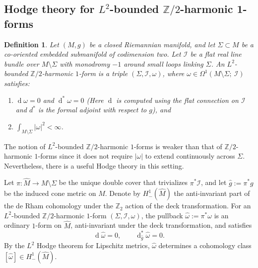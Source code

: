 \documentclass[11pt]{amsart}
\newcommand{\ZT}{\mathbb{Z}/2}
\renewcommand{\d}{\operatorname{d}}
\newtheorem{definition}[theorem]{Definition}
\begin{document}
\subsection{Hodge theory for \texorpdfstring{$L^2$}{L2}-bounded \texorpdfstring{$\ZT$}{Z/2}-harmonic 1-forms}
\begin{definition}
	Let $(M,g)$ be a closed Riemannian manifold, and let $\Sigma\subset M$ be a co-oriented
	embedded submanifold of codimension two. Let $\mathcal I$ be a flat real line bundle over
	$M\setminus\Sigma$ with monodromy $-1$ around small loops linking $\Sigma$.
	An \emph{$L^2$-bounded $\ZT$-harmonic $1$-form} is a triple $(\Sigma,\mathcal I,\omega)$, where
	$\omega\in \Omega^1(M\setminus\Sigma;\:\mathcal I)$ satisfies:
	\begin{enumerate}
		\item $\d \omega=0$ and $\d^\ast\!\omega=0$ (Here $\d$ is computed using the flat connection on
		$\mathcal I$ and $d^\ast$ is the formal adjoint with respect to $g$), and
		\item $\displaystyle \int_{M\setminus\Sigma}|\omega|^2<\infty$.
	\end{enumerate}
\end{definition}

The notion of $L^2$-bounded $\ZT$-harmonic $1$-forms is weaker than that of $\ZT$-harmonic $1$-forms
since it does not require $|\omega|$ to extend continuously across $\Sigma$. Nevertheless, there is a useful Hodge theory in this setting.

Let $\pi\colon \widehat M\to M\setminus\Sigma$ be the unique double cover that trivializes $\pi^\ast\mathcal I$,
and let $\hat g:=\pi^\ast g$ be the induced cone metric on $\widehat M$. Denote by $H^1_-(\widehat M)$ the
anti-invariant part of the de Rham cohomology under the $\mathbb{Z}_2$ action of the deck transformation. For an $L^2$-bounded
$\ZT$-harmonic $1$-form $(\Sigma,\mathcal I,\omega)$, the pullback $\hat\omega:=\pi^\ast\omega$ is an
ordinary $1$-form on $\widehat M$, anti-invariant under the deck transformation, and satisfies
\[
\d\hat\omega=0,\qquad \d^\ast_{\hat g}\hat\omega=0.
\]
By the $L^2$ Hodge theorem for Lipschitz metrics, $\hat\omega$ determines a cohomology class
$[\hat\omega]\in H^1_-(\widehat M)$.
\end{document}
